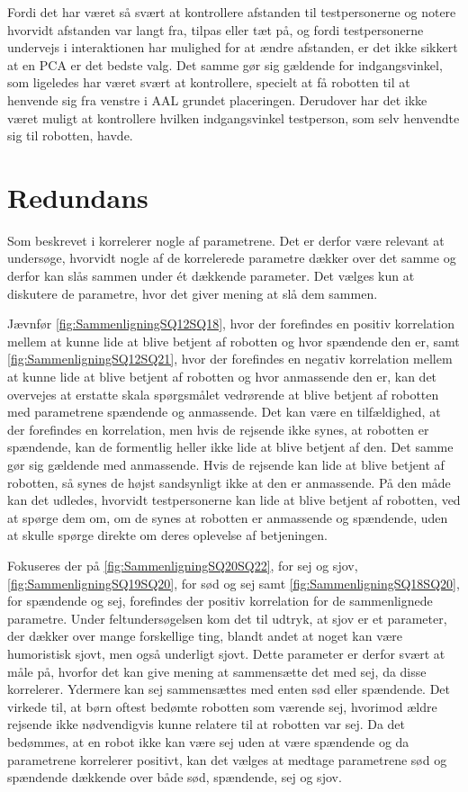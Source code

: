 Fordi det har været så svært at kontrollere afstanden til testpersonerne og notere hvorvidt afstanden var langt fra, tilpas eller tæt på, og fordi testpersonerne undervejs i interaktionen har mulighed for at ændre afstanden, er det ikke sikkert at en PCA er det bedste valg. Det samme gør sig gældende for indgangsvinkel, som ligeledes har været svært at kontrollere, specielt at få robotten til at henvende sig fra venstre i AAL grundet placeringen. Derudover har det ikke været muligt at kontrollere hvilken indgangsvinkel testperson, som selv henvendte sig til robotten, havde. 


\section{Redundans}
\label{DiskussionRedundansSkalaer}
%
Som beskrevet i  korrelerer nogle af parametrene. Det er derfor være relevant at undersøge, hvorvidt nogle af de korrelerede parametre dækker over det samme og derfor kan slås sammen under ét dækkende parameter. Det vælges kun at diskutere de parametre, hvor det giver mening at slå dem sammen. 

Jævnfør \autoref{fig:SammenligningSQ12SQ18}, hvor der forefindes en positiv korrelation mellem at kunne lide at blive betjent af robotten og hvor spændende den er, samt \autoref{fig:SammenligningSQ12SQ21}, hvor der forefindes en negativ korrelation mellem at kunne lide at blive betjent af robotten og hvor anmassende den er, kan det overvejes at erstatte skala spørgsmålet vedrørende at blive betjent af robotten med parametrene spændende og anmassende. Det kan være en tilfældighed, at der forefindes en korrelation, men hvis de rejsende ikke synes, at robotten er spændende, kan de formentlig heller ikke lide at blive betjent af den. Det samme gør sig gældende med anmassende. Hvis de rejsende kan lide at blive betjent af robotten, så synes de højst sandsynligt ikke at den er anmassende. På den måde kan det udledes, hvorvidt testpersonerne kan lide at blive betjent af robotten, ved at spørge dem om, om de synes at robotten er anmassende og spændende, uden at skulle spørge direkte om deres oplevelse af betjeningen.

Fokuseres der på \autoref{fig:SammenligningSQ20SQ22}, for sej og sjov, \autoref{fig:SammenligningSQ19SQ20}, for sød og sej samt \autoref{fig:SammenligningSQ18SQ20}, for spændende og sej, forefindes der positiv korrelation for de sammenlignede parametre. Under feltundersøgelsen kom det til udtryk, at sjov er et parameter, der dækker over mange forskellige ting, blandt andet at noget kan være humoristisk sjovt, men også underligt sjovt. Dette parameter er derfor svært at måle på, hvorfor det kan give mening at sammensætte det med sej, da disse korrelerer. Ydermere kan sej sammensættes med enten sød eller spændende. Det virkede til, at børn oftest bedømte robotten som værende sej, hvorimod ældre rejsende ikke nødvendigvis kunne relatere til at robotten var sej. Da det bedømmes, at en robot ikke kan være sej uden at være spændende og da parametrene korrelerer positivt, kan det vælges at medtage parametrene sød og spændende dækkende over både sød, spændende, sej og sjov.  

